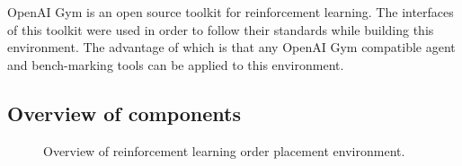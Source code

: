 OpenAI Gym \cite{brockman2016openai} is an open source toolkit for reinforcement learning.
The interfaces of this toolkit were used in order to follow their standards while building this environment.
The advantage of which is that any OpenAI Gym compatible agent and bench-marking tools can be applied to this environment.

\subsection{Overview of components}

\begin{figure}[H]
    \centering
    \caption{Overview of reinforcement learning order placement environment.}
    \label{fig:rl-env-overview}
\end{figure}

